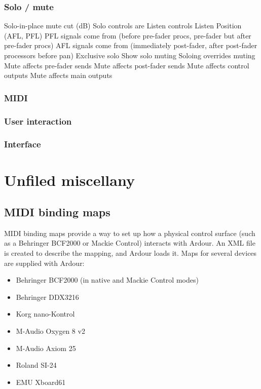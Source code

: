\documentclass[10pt,a4paper]{book}
\begin{document}
{\subsection{Solo / mute}

Solo-in-place mute cut (dB)
Solo controls are Listen controls
Listen Position (AFL, PFL)
PFL signals come from (before pre-fader procs, pre-fader but after pre-fader procs)
AFL signals come from (immediately post-fader, after post-fader processors before pan)
Exclusive solo
Show solo muting
Soloing overrides muting
Mute affects pre-fader sends
Mute affects post-fader sends
Mute affects control outputs
Mute affects main outputs


\subsection{MIDI}
\subsection{User interaction}
\subsection{Interface}








\chapter{Unfiled miscellany}

\section{MIDI binding maps}

MIDI binding maps provide a way to set up how a physical control
surface (such as a Behringer BCF2000 or Mackie Control) interacts with
Ardour.  An XML file is created to describe the mapping, and Ardour
loads it.  Maps for several devices are supplied with Ardour:

\begin{itemize}
\item Behringer BCF2000 (in native and Mackie Control modes)
\item Behringer DDX3216
\item Korg nano-Kontrol
\item M-Audio Oxygen 8 v2
\item M-Audio Axiom 25
\item Roland SI-24
\item EMU Xboard61
\end{itemize}

}
\end{document}
